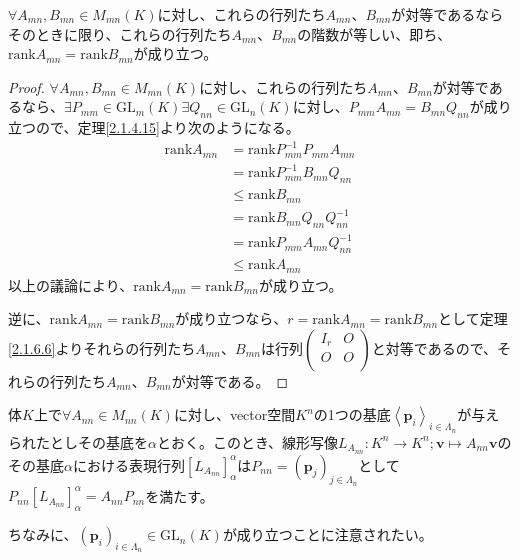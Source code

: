 \documentclass[dvipdfmx]{jsarticle}
\begin{document}
\begin{thm}\label{2.1.6.7}
$\forall A_{mn},B_{mn} \in M_{mn}(K)$に対し、これらの行列たち$A_{mn}$、$B_{mn}$が対等であるならそのときに限り、これらの行列たち$A_{mn}$、$B_{mn}$の階数が等しい、即ち、${\mathrm{rank}}A_{mn} = {\mathrm{rank}}B_{mn}$が成り立つ。
\end{thm}
\begin{proof}
$\forall A_{mn},B_{mn} \in M_{mn}(K)$に対し、これらの行列たち$A_{mn}$、$B_{mn}$が対等であるなら、$\exists P_{mm} \in {\mathrm{GL}}_{m}(K)\exists Q_{nn} \in {\mathrm{GL}}_{n}(K)$に対し、$P_{mm}A_{mn} = B_{mn}Q_{nn}$が成り立つので、定理\ref{2.1.4.15}より次のようになる。
\begin{align*}
{\mathrm{rank}}A_{mn} &= {\mathrm{rank}}{P_{mm}^{- 1}P_{mm}A_{mn}}\\
&= {\mathrm{rank}}{P_{mm}^{- 1}B_{mn}Q_{nn}}\\
&\leq {\mathrm{rank}}B_{mn}\\
&= {\mathrm{rank}}{B_{mn}Q_{nn}Q_{nn}^{- 1}}\\
&= {\mathrm{rank}}{P_{mm}A_{mn}Q_{nn}^{- 1}}\\
&\leq {\mathrm{rank}}A_{mn}
\end{align*}
以上の議論により、${\mathrm{rank}}A_{mn} = {\mathrm{rank}}B_{mn}$が成り立つ。\par
逆に、${\mathrm{rank}}A_{mn} = {\mathrm{rank}}B_{mn}$が成り立つなら、$r = {\mathrm{rank}}A_{mn} = {\mathrm{rank}}B_{mn}$として定理\ref{2.1.6.6}よりそれらの行列たち$A_{mn}$、$B_{mn}$は行列$\begin{pmatrix}
I_{r} & O \\
O & O \\
\end{pmatrix}$と対等であるので、それらの行列たち$A_{mn}$、$B_{mn}$が対等である。
\end{proof}
\begin{thm}\label{2.1.6.8}
体$K$上で$\forall A_{nn} \in M_{nn}(K)$に対し、vector空間$K^{n}$の1つの基底$\left\langle \mathbf{p}_{i} \right\rangle_{i \in \varLambda_{n}}$が与えられたとしその基底を$\alpha$とおく。このとき、線形写像$L_{A_{nn}}:K^{n} \rightarrow K^{n};\mathbf{v} \mapsto A_{nn}\mathbf{v}$のその基底$\alpha$における表現行列$\left[ L_{A_{nn}} \right]_{\alpha}^{\alpha}$は$P_{nn} = \left( \mathbf{p}_{j} \right)_{j \in \varLambda_{n}}$として$P_{nn}\left[ L_{A_{nn}} \right]_{\alpha}^{\alpha} = A_{nn}P_{nn}$を満たす。
\end{thm}\par
ちなみに、$\left( \mathbf{p}_{i} \right)_{i \in \varLambda_{n}} \in {\mathrm{GL}}_{n}(K)$が成り立つことに注意されたい。
\end{document}
